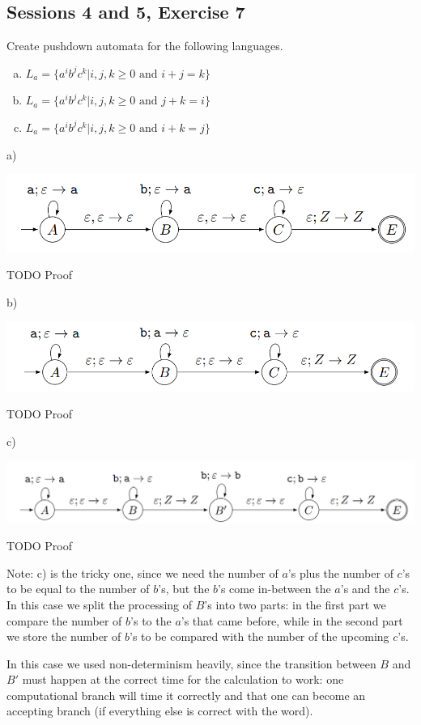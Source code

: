 \subsection{Sessions 4 and 5, Exercise 7}

\label{4f7}


Create pushdown automata for the following languages.
\begin{enumerate}[a)]
    \item $L_a = \{a^ib^jc^k | i,j,k \geq{} 0\text{ and }i+j = k\}$
    \item $L_a = \{a^ib^jc^k | i,j,k \geq{} 0\text{ and }j+k = i\}$
    \item $L_a = \{a^ib^jc^k | i,j,k \geq{} 0\text{ and }i+k = j\}$
\end{enumerate}



a)

\includegraphics[width=\linewidth]{04/4_7_a.png}

TODO Proof

b)

\includegraphics[width=\linewidth]{04/4_7_b.png}

TODO Proof

c)

\includegraphics[width=\linewidth]{04/4_7_c.png}

TODO Proof

Note: c) is the tricky one, since we need the number of $a$'s plus the number of $c$'s to be equal to the number of $b$'s, but the $b$'s come in-between the $a$'s and the $c$'s. In this case we split the processing of $B$'s into two parts: in the first part we compare the number of $b$'s to the $a$'s that came before, while in the second part we store the number of $b$'s to be compared with the number of the upcoming $c$'s.

In this case we used non-determinism heavily, since the transition between $B$ and $B'$ must happen at the correct time for the calculation to work: one computational branch will time it correctly and that one can become an accepting branch (if everything else is correct with the word).